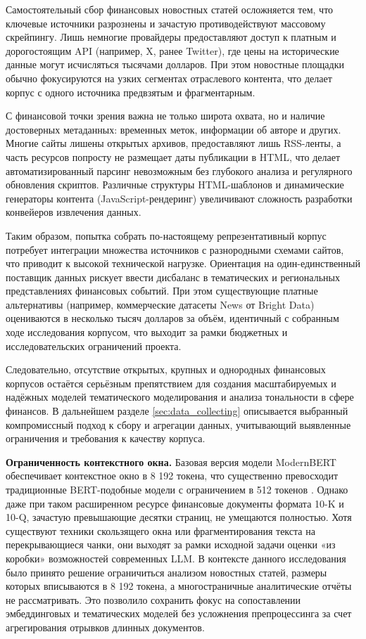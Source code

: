 Самостоятельный сбор финансовых новостных статей осложняется тем, что ключевые источники разрознены и зачастую
противодействуют массовому скрейпингу. Лишь немногие провайдеры предоставляют доступ к платным и дорогостоящим
API (например, X, ранее Twitter), где цены на исторические данные могут исчисляться тысячами долларов. При этом
новостные площадки обычно фокусируются на узких сегментах отраслевого контента, что делает корпус с одного
источника предвзятым и фрагментарным.

С финансовой точки зрения важна не только широта охвата, но и наличие достоверных метаданных: временных меток,
информации об авторе и других. Многие сайты лишены открытых архивов, предоставляют лишь RSS-ленты, а часть ресурсов
попросту не размещает даты публикации в HTML, что делает автоматизированный парсинг невозможным без глубокого
анализа и регулярного обновления скриптов. Различные структуры HTML-шаблонов и динамические генераторы контента
(JavaScript-рендеринг) увеличивают сложность разработки конвейеров извлечения данных.

Таким образом, попытка собрать по-настоящему репрезентативный корпус потребует интеграции множества источников
с разнородными схемами сайтов, что приводит к высокой технической нагрузке. Ориентация на один-единственный
поставщик данных рискует ввести дисбаланс в тематических и региональных представлениях финансовых событий. При
этом существующие платные альтернативы (например, коммерческие датасеты News от Bright
Data) оцениваются в несколько тысяч долларов
за объём, идентичный с собранным ходе исследования корпусом, что выходит за рамки бюджетных и исследовательских
ограничений проекта.

Следовательно, отсутствие открытых, крупных и однородных финансовых корпусов остаётся серьёзным препятствием
для создания масштабируемых и надёжных моделей тематического моделирования и анализа тональности в сфере финансов.
В дальнейшем разделе \ref{sec:data_collecting} описывается выбранный компромиссный подход к сбору и агрегации
данных, учитывающий выявленные ограничения и требования к качеству корпуса.

\textbf{Ограниченность контекстного окна.} Базовая версия модели ModernBERT обеспечивает контекстное окно
в 8 192 токена, что существенно превосходит традиционные BERT-подобные модели с ограничением в 512 токенов
\parencite{devlin2019BERT,Warner2024ModernBERT}. Однако даже при таком расширенном ресурсе финансовые документы
формата 10-K и 10-Q, зачастую превышающие десятки страниц, не умещаются полностью. Хотя существуют техники
скользящего окна или фрагментирования текста на перекрывающиеся чанки, они выходят за рамки исходной задачи
оценки «из коробки» возможностей современных LLM. В контексте данного исследования было принято решение
ограничиться анализом новостных статей, размеры которых вписываются в 8 192 токена, а многостраничные аналитические
отчёты не рассматривать. Это позволило сохранить фокус на сопоставлении эмбеддинговых и тематических моделей
без усложнения препроцессинга за счет агрегирования отрывков длинных документов.

